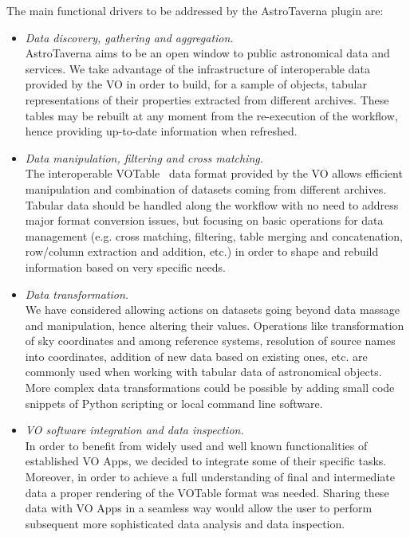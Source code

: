 \documentclass[final,authoryear,5p,times,twocolumn]{elsarticle}
\begin{document}
The main functional drivers to be addressed by the AstroTaverna plugin are:
\begin{itemize}
\item
\textit{Data discovery, gathering and aggregation.}\\
AstroTaverna aims to be an open window to public astronomical data and services. We take advantage of the infrastructure of interoperable data provided by the VO in order to build, for a sample of objects, tabular representations of their properties extracted from different archives. These tables may be rebuilt at any moment from the re-execution of the workflow, hence providing up-to-date information when refreshed.
\item
\textit{Data manipulation, filtering and cross matching.}\\
The interoperable VOTable~\citep{Ochsenbein2009} data format provided by the VO allows efficient manipulation and combination of datasets coming from different archives. Tabular data should be handled along the workflow with no need to address major format conversion issues, but focusing on basic operations for data management (e.g. cross matching, filtering, table merging and concatenation, row/column extraction and addition, etc.) in order to shape and rebuild information based on very specific needs.
\item
\textit{Data transformation.}\\
We have considered allowing actions on datasets going beyond data massage and manipulation, hence altering their values. Operations like transformation of sky coordinates and among reference systems, resolution of source names into coordinates, addition of new data based on existing ones, etc. are commonly used when working with tabular data of astronomical objects. More complex data transformations could be possible by adding small code snippets of Python scripting or local command line software.
\item
\textit{VO software integration and data inspection.}\\
In order to benefit from widely used and well known functionalities of established VO Apps, we decided to integrate some of their specific tasks. Moreover, in order to achieve a full understanding of final and intermediate data a proper rendering of the VOTable format was needed. Sharing these data with VO Apps in a seamless way would allow the user to perform subsequent more sophisticated data analysis and data inspection.
\end{itemize}
\end{document}
